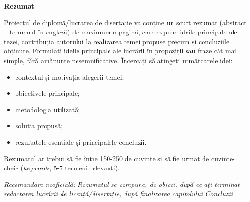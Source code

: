 \newpage
\begin{center}
    \LARGE
    \textbf{\thesistitle}
    
    \vspace{0.5cm}
    
    \authornamefl
    
    \vspace{1cm}
    
    \textbf{Rezumat}
    
    \vspace{1cm}
\end{center}


Proiectul de diplomă/lucrarea de disertație va conține un scurt rezumat (abstract – termenul în engleză) de maximum o pagină, care expune ideile principale ale tezei, contribuția autorului la realizarea temei propuse precum și concluziile obținute. Formulați ideile principale ale lucrării în propoziții sau fraze cât mai simple, fără amănunte nesemnificative. Încercați să atingeți următoarele idei:
\begin{itemize}
    \item contextul și motivația alegerii temei;
    \item obiectivele principale;
    \item metodologia utilizată;
    \item soluția propusă;
    \item rezultatele esențiale și principalele concluzii.
\end{itemize}

Rezumatul ar trebui să fie între 150-250 de cuvinte și să fie urmat de cuvinte-cheie (\textit{keywords}, 5-7 termeni relevanți).

\textit{Recomandare neoficială: Rezumatul se compune, de obicei, după ce ați terminat redactarea lucrării de licență/disertație, după finalizarea capitolului Concluzii}